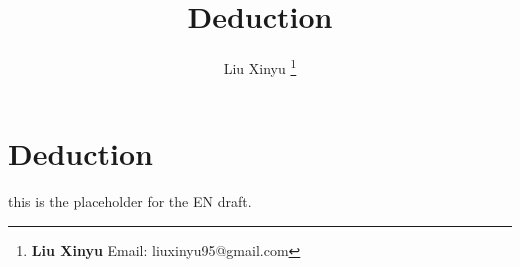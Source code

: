 \documentclass{article}
\begin{document}
\title{Deduction}

\author{Liu Xinyu
\thanks{{\bfseries Liu Xinyu} \newline
  Email: liuxinyu95@gmail.com}}

\maketitle
\fi


\ifx\wholebook\relax
\chapter{Deduction}
\fi

this is the placeholder for the EN draft.

\ifx\wholebook\relax \else
\begin{thebibliography}{99}

\end{thebibliography}

\expandafter\enddocument

\fi
\end{document}
